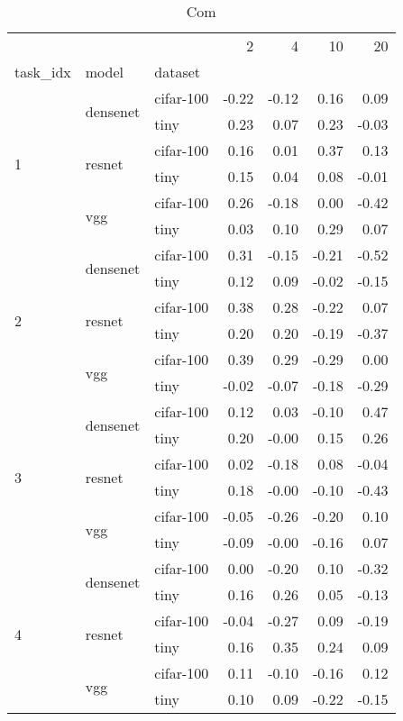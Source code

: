 \begin{table}
\caption{Com}
\begin{tabular}{lllrrrr}
\toprule
 &  &  & 2 & 4 & 10 & 20 \\
task_idx & model & dataset &  &  &  &  \\
\midrule
\multirow[c]{6}{*}{1} & \multirow[c]{2}{*}{densenet} & cifar-100 & -0.22 & -0.12 & 0.16 & 0.09 \\
 &  & tiny & 0.23 & 0.07 & 0.23 & -0.03 \\
 & \multirow[c]{2}{*}{resnet} & cifar-100 & 0.16 & 0.01 & 0.37 & 0.13 \\
 &  & tiny & 0.15 & 0.04 & 0.08 & -0.01 \\
 & \multirow[c]{2}{*}{vgg} & cifar-100 & 0.26 & -0.18 & 0.00 & -0.42 \\
 &  & tiny & 0.03 & 0.10 & 0.29 & 0.07 \\
\multirow[c]{6}{*}{2} & \multirow[c]{2}{*}{densenet} & cifar-100 & 0.31 & -0.15 & -0.21 & -0.52 \\
 &  & tiny & 0.12 & 0.09 & -0.02 & -0.15 \\
 & \multirow[c]{2}{*}{resnet} & cifar-100 & 0.38 & 0.28 & -0.22 & 0.07 \\
 &  & tiny & 0.20 & 0.20 & -0.19 & -0.37 \\
 & \multirow[c]{2}{*}{vgg} & cifar-100 & 0.39 & 0.29 & -0.29 & 0.00 \\
 &  & tiny & -0.02 & -0.07 & -0.18 & -0.29 \\
\multirow[c]{6}{*}{3} & \multirow[c]{2}{*}{densenet} & cifar-100 & 0.12 & 0.03 & -0.10 & 0.47 \\
 &  & tiny & 0.20 & -0.00 & 0.15 & 0.26 \\
 & \multirow[c]{2}{*}{resnet} & cifar-100 & 0.02 & -0.18 & 0.08 & -0.04 \\
 &  & tiny & 0.18 & -0.00 & -0.10 & -0.43 \\
 & \multirow[c]{2}{*}{vgg} & cifar-100 & -0.05 & -0.26 & -0.20 & 0.10 \\
 &  & tiny & -0.09 & -0.00 & -0.16 & 0.07 \\
\multirow[c]{6}{*}{4} & \multirow[c]{2}{*}{densenet} & cifar-100 & 0.00 & -0.20 & 0.10 & -0.32 \\
 &  & tiny & 0.16 & 0.26 & 0.05 & -0.13 \\
 & \multirow[c]{2}{*}{resnet} & cifar-100 & -0.04 & -0.27 & 0.09 & -0.19 \\
 &  & tiny & 0.16 & 0.35 & 0.24 & 0.09 \\
 & \multirow[c]{2}{*}{vgg} & cifar-100 & 0.11 & -0.10 & -0.16 & 0.12 \\
 &  & tiny & 0.10 & 0.09 & -0.22 & -0.15 \\
\bottomrule
\end{tabular}
\end{table}
